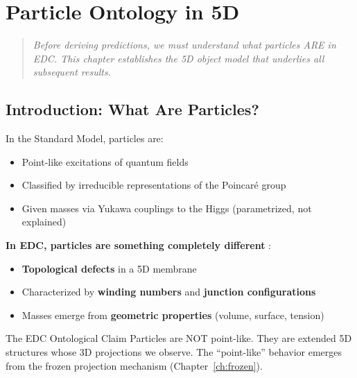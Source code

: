 \chapter{Particle Ontology in 5D}
\label{ch:ontology}

\begin{quote}
\textit{Before deriving predictions, we must understand what particles ARE in EDC.
This chapter establishes the 5D object model that underlies all subsequent results.}
\end{quote}

\section{Introduction: What Are Particles?}
\label{sec:ontology_intro}

In the Standard Model, particles are:
\begin{itemize}[nosep]
\item Point-like excitations of quantum fields
\item Classified by irreducible representations of the Poincaré group
\item Given masses via Yukawa couplings to the Higgs (parametrized, not explained)
\end{itemize}

\textbf{In EDC, particles are something completely different} \tagP{}:
\begin{itemize}[nosep]
\item \textbf{Topological defects} in a 5D membrane
\item Characterized by \textbf{winding numbers} and \textbf{junction configurations}
\item Masses emerge from \textbf{geometric properties} (volume, surface, tension)
\end{itemize}

\begin{statusbox}{The EDC Ontological Claim}
Particles are NOT point-like. They are extended 5D structures whose
3D projections we observe. The ``point-like'' behavior emerges from
the frozen projection mechanism (Chapter~\ref{ch:frozen}).
\end{statusbox}

